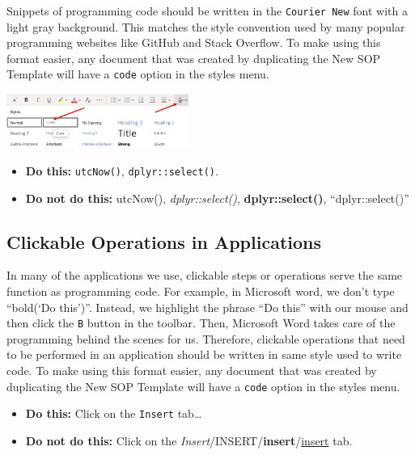 \documentclass[
  letterpaper,
  DIV=11,
  numbers=noendperiod]{scrreprt}
\providecommand{\tightlist}{%
  \setlength{\itemsep}{0pt}\setlength{\parskip}{0pt}}\usepackage{longtable,booktabs,array}
\begin{document}
Snippets of programming code should be written in the
\texttt{Courier\ New} font with a light gray background. This matches
the style convention used by many popular programming websites like
GitHub and Stack Overflow. To make using this format easier, any
document that was created by duplicating the New SOP Template will have
a \texttt{code} option in the styles menu.

\begin{center}
\includegraphics[width=2.34in,height=\textheight]{chapters/style_guide/../../graphics/code_snippet.png}
\end{center}

\begin{itemize}
\tightlist
\item
  \textbf{Do this:} \texttt{utcNow()}, \texttt{dplyr::select()}.
\item
  \textbf{Do not do this:} utcNow(), \emph{dplyr::select()},
  \textbf{dplyr::select()}, ``dplyr::select()''
\end{itemize}

\subsection{Clickable Operations in
Applications}\label{clickable-operations-in-applications}

In many of the applications we use, clickable steps or operations serve
the same function as programming code. For example, in Microsoft word,
we don't type ``bold(`Do this')''. Instead, we highlight the phrase ``Do
this'' with our mouse and then click the \texttt{B} button in the
toolbar. Then, Microsoft Word takes care of the programming behind the
scenes for us. Therefore, clickable operations that need to be performed
in an application should be written in same style used to write code. To
make using this format easier, any document that was created by
duplicating the New SOP Template will have a \texttt{code} option in the
styles menu.

\begin{itemize}
\tightlist
\item
  \textbf{Do this:} Click on the \texttt{Insert} tab\ldots{}
\item
  \textbf{Do not do this:} Click on the
  \emph{Insert}/INSERT/\textbf{insert}/\ul{insert} tab.
\end{itemize}
\end{document}
